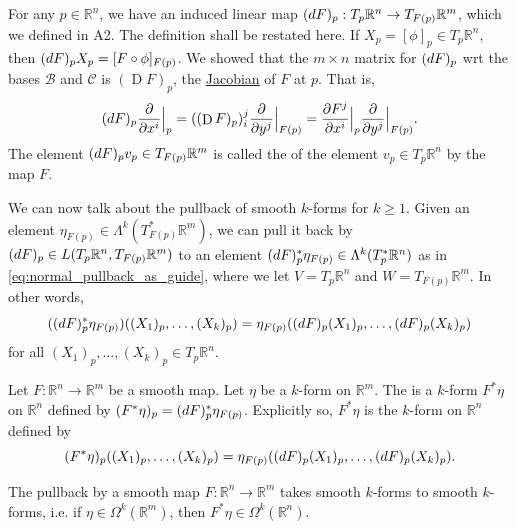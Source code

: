 \documentclass[notoc,notitlepage]{tufte-book}
\DeclareMathOperator{\D}{D}
\begin{document}
For any $p \in \mathbb{R}^n$, we have an induced linear map $(\mathop{}\!d{F})_p : T_p \mathbb{R}^n \to
T_{F(p)} \mathbb{R}^m$, which we defined in A2. The definition shall be restated here. If $X_p
= [\phi]_p \in T_p \mathbb{R}^n$, then $(\mathop{}\!d{F})_p X_p = [F \circ \phi]_{F(p)}$. We showed that
the $m \times n$ matrix for $(\mathop{}\!d{F})_p$ wrt the bases $\mathcal{B}$ and $\mathcal{C}$ is
$(\D F)_p$, the \hyperref[defn:differential]{Jacobian} of $F$ at $p$. That is,
\begin{equation}\label{eq:linear_map_across_tangent_spaces_over_f}
  (\dif{F})_p \frac{\partial}{\partial x^i} \at{p}{} 
  = ((\D F)_p)_i^j \frac{\partial}{\partial y^j} \at{F(p)}{}
  = \frac{\partial F^j}{\partial x^i} \at{p}{} \frac{\partial}{\partial y^j} \at{F(p)}{}.
\end{equation}
The element $(\mathop{}\!d{F})_p v_p \in T_{F(p)} \mathbb{R}^m$ is called the  of the
element $v_p \in T_p \mathbb{R}^n$ by the map $F$.

We can now talk about the pullback of smooth $k$-forms for $k \geq 1$. Given an element
$\eta_{F(p)} \in \Lambda^k(T_{F(p)}^* \mathbb{R}^m)$, we can pull it back by $(\mathop{}\!d{F})_p \in
L(T_p \mathbb{R}^n, T_{F(p)} \mathbb{R}^m)$ to an element $(\mathop{}\!d{F})_p^* \eta_{F(p)} \in
\Lambda^k(T_p^* \mathbb{R}^n)$ as in \cref{eq:normal_pullback_as_guide}, where we let $V = T_p
\mathbb{R}^n$ and $W = T_{F(p)} \mathbb{R}^m$. In other words,
\begin{equation*}
  ((\mathop{}\!d{F})_p^* \eta_{F(p)})((X_1)_p, \ldots, (X_k)_p)
  = \eta_{F(p)} ((\mathop{}\!d{F})_p(X_1)_p, \ldots, (\mathop{}\!d{F})_p(X_k)_p)
\end{equation*}
for all $(X_1)_p, \ldots, (X_k)_p \in T_p \mathbb{R}^n$.

\begin{defn}\label{defn:pullback_by_f_of_a_k_form}
  Let $F : \mathbb{R}^n \to \mathbb{R}^m$ be a smooth map. Let $\eta$ be a $k$-form on
  $\mathbb{R}^m$. The  is a $k$-form $F^* \eta$ on
  $\mathbb{R}^n$ defined by $(F^* \eta)_p = (\mathop{}\!d{F})_p^* \eta_{F(p)}$. Explicitly so, $F^* \eta$
  is the $k$-form on $\mathbb{R}^n$ defined by
  \begin{equation*}
    (F^* \eta)_p ((X_1)_p, \ldots, (X_k)_p)
    = \eta_{F(p)} ((\mathop{}\!d{F})_p(X_1)_p, \ldots, (\mathop{}\!d{F})_p(X_k)_p).
  \end{equation*}
\end{defn}

\begin{propo}\label{propo:pullbacks_preserve_smoothness}
  The pullback by a smooth map $F : \mathbb{R}^n \to \mathbb{R}^m$ takes smooth $k$-forms to
  smooth $k$-forms, i.e. if $\eta \in \Omega^k(\mathbb{R}^m)$, then $F^* \eta \in \Omega^k(
  \mathbb{R}^n)$.
\end{propo}
\end{document}
